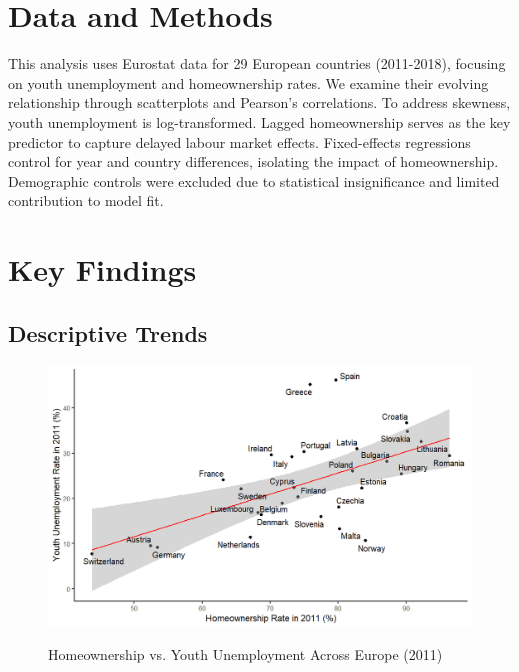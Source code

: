 \documentclass[11pt]{article}
\begin{document}
\begin{multicols}{2}
		\vspace{-1em}
		
		\section*{Data and Methods}
		This analysis uses Eurostat data for 29 European countries (2011-2018), focusing on youth unemployment and homeownership rates. We examine their evolving relationship through scatterplots and Pearson's correlations. To address skewness, youth unemployment is log-transformed. Lagged homeownership serves as the key predictor to capture delayed labour market effects. Fixed-effects regressions control for year and country differences, isolating the impact of homeownership. Demographic controls were excluded due to statistical insignificance and limited contribution to model fit.
				
		\vspace{-1em}
		
		\section*{Key Findings}
		
		\subsection*{Descriptive Trends}
		
		\begin{figure}[H]
			\centering
			\caption{Homeownership vs. Youth Unemployment Across Europe (2011)}
			\includegraphics[width=1\linewidth]{youth_unemployment_2011.png}
			\label{fig:youth_unemployment_2011}
		\end{figure}
		

\end{multicols}
\end{document}
